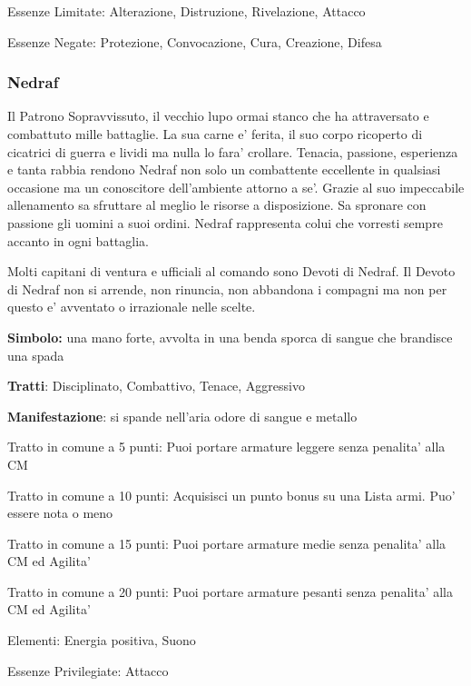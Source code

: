 \documentclass[a4paper,11pt,twoside,openany]{book}
\begin{document}
{		Essenze Limitate: Alterazione, Distruzione, Rivelazione, Attacco
		
		Essenze Negate: Protezione, Convocazione, Cura, Creazione, Difesa
		
		\subsubsection{Nedraf}
		
		\label{nedraf}
		
		Il Patrono Sopravvissuto, il vecchio lupo ormai stanco che ha attraversato e combattuto mille battaglie. La sua carne e' ferita, il suo corpo ricoperto di cicatrici di guerra e lividi ma nulla lo fara' crollare. Tenacia, passione, esperienza e tanta rabbia rendono Nedraf non solo un combattente eccellente in qualsiasi occasione ma un conoscitore dell'ambiente attorno a se'. Grazie al suo impeccabile allenamento sa sfruttare al meglio le risorse a disposizione. Sa spronare con passione gli uomini a suoi ordini.
		Nedraf rappresenta colui che vorresti sempre accanto in ogni battaglia. 
		
		Molti capitani di ventura e ufficiali al comando sono Devoti di Nedraf. Il Devoto di Nedraf non si arrende, non rinuncia, non abbandona i compagni ma non per questo e' avventato o irrazionale nelle scelte.
		
		\textbf{Simbolo:} una mano forte, avvolta in una benda sporca di sangue
		che brandisce una spada
		
		\textbf{Tratti}: Disciplinato, Combattivo, Tenace, Aggressivo
		
		\textbf{Manifestazione}: si spande nell'aria odore di sangue e metallo
		
		\bigskip
		
		Tratto in comune a 5 punti: Puoi portare armature leggere senza penalita' alla CM
		
		Tratto in comune a 10 punti: Acquisisci un punto bonus su una Lista armi. Puo' essere nota o meno
		
		Tratto in comune a 15 punti: Puoi portare armature medie senza penalita' alla CM ed Agilita'
		
		Tratto in comune a 20 punti: Puoi portare armature pesanti senza penalita' alla CM ed Agilita'
		
		\bigskip
		
		Elementi: Energia positiva, Suono
		
		\bigskip
		
		Essenze Privilegiate: Attacco
		
}
\end{document}
